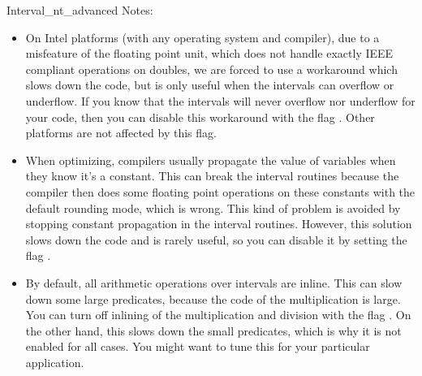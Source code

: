 \begin{ccAdvanced}
\begin{ccClass} {Interval_nt_advanced}
Notes:\\
\begin{itemize}
\item On Intel platforms (with any operating system and compiler), due to a
      misfeature of the floating point unit, which does not handle exactly
      IEEE compliant operations on doubles, we are forced to use a workaround
      which slows down the code, but is only useful when the intervals can
      overflow or underflow.  If you know that the intervals will never
      overflow nor underflow for your code, then you can disable this
      workaround with the flag .
      Other platforms are not affected by this flag.
\item When optimizing, compilers usually propagate the value of variables when
      they know it's a constant.  This can break the interval routines because
      the compiler then does some floating point operations on these constants
      with the default rounding mode, which is wrong.  This kind of problem
      is avoided by stopping constant propagation in the interval routines.
      However, this solution slows down the code and is rarely useful, so you
      can disable it by setting the flag
      .
\item By default, all arithmetic operations over intervals are inline.  This
      can slow down some large predicates, because the code of the
      multiplication is large.  You can turn off inlining of the
      multiplication and division with the flag .
      On the other hand, this slows down the small predicates, which is why
      it is not enabled for all cases.
      You might want to tune this for your particular application.
\end{itemize}

\end{ccClass}

\end{ccAdvanced}


